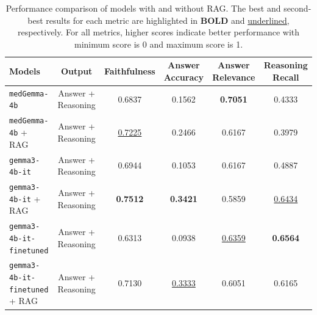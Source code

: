 \begin{table}[t]
\centering
\caption{Performance comparison of models with and without \ac{RAG}. The best and second-best results for each metric are highlighted in \textbf{BOLD} and \underline{underlined}, respectively. For all metrics, higher scores indicate better performance with minimum score is 0 and maximum score is 1.}
\label{tab:eval_answer_reasoning}
\renewcommand{\arraystretch}{1.2}
\begin{tabular}{lc|cccc}
\hline
\textbf{Models} &
\textbf{Output} &
\textbf{Faithfulness} &
\textbf{Answer Accuracy} &
\textbf{Answer Relevance} &
\textbf{Reasoning Recall} \\
\hline

\texttt{medGemma-4b}
& Answer + Reasoning
& 0.6837 & 0.1562 & \textbf{0.7051} & 0.4333 \\

\texttt{medGemma-4b} + RAG
& Answer + Reasoning
& \underline{0.7225} & 0.2466 & 0.6167 & 0.3979 \\

\texttt{gemma3-4b-it}
& Answer + Reasoning
& 0.6944 & 0.1053 & 0.6167 & 0.4887 \\

\texttt{gemma3-4b-it} + RAG
& Answer + Reasoning
& \textbf{0.7512} & \textbf{0.3421} & 0.5859 & \underline{0.6434} \\

\texttt{gemma3-4b-it-finetuned}
& Answer + Reasoning
& 0.6313 & 0.0938 & \underline{0.6359} & \textbf{0.6564} \\

\texttt{gemma3-4b-it-finetuned} + RAG
& Answer + Reasoning
& 0.7130 & \underline{0.3333} & 0.6051 & 0.6165 \\

\hline
\end{tabular}
\end{table}






